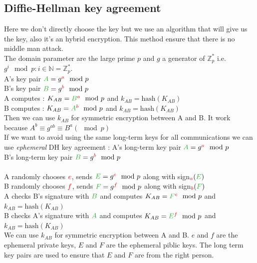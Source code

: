 \documentclass[11pt,a4paper]{report}
\newcommand{\tg}{\textcolor{ao}}
\newcommand{\tr}{\textcolor{red}}
\begin{document}
\subsection{Diffie-Hellman key agreement}
Here we don't directly choose the key but we use an algorithm that will give us the key, also it's an hybrid encryption. This method ensure that there is no middle man attack.\\
The domain parameter are the large prime $p$ and $g$ a generator of $\mathbb{Z}_p^*$ i.e. ${g^i \mod p : i \in \mathbb{N}} = \mathbb{Z}_p^*$. \\
A's key pair $\tg{A} = g^{\tr{a}} \mod p$\\
B's key pair $\tg{B} = g^{\tr{b}} \mod p$\\
A computes : $K_{AB} = \tg{B}^{\tr{a}} \mod p$ and $k_{AB} = \text{hash}(K_{AB})$\\
B computes : $K_{AB} = \tg{A}^{\tr{b}} \mod p$ and $k_{AB} = \text{hash}(K_{AB})$\\
Then we can use $k_{AB}$ for symmetric encryption between A and B. It work because $A^b \equiv g^{ab} \equiv B^a  (\mod p)$\\

If we want to avoid using the same long-term keys for all communications we can use \emph{ephemeral} DH key agreement :
A's long-term key pair $\tg{A} = g^{\tr{a}} \mod p$\\
B's long-term key pair $\tg{B} = g^{\tr{b}} \mod p$\\
\\
A randomly chooses $\tr{e}$, sends $\tg{E} = g^{\tr{e}} \mod p$ along with sign$_{\tr{a}} (\tg{E})$\\
B randomly chooses $\tr{f}$, sends $\tg{F} = g^{\tr{f}} \mod p$ along with sign$_{\tr{b}} (\tg{F})$\\
A checks B's signature with $\tg{B}$ and computes $K_{AB} = \tg{F}^{\tr{e}} \mod p$ and $k_{AB} = \text{hash}(K_{AB})$\\
B checks A's signature with $\tg{A}$ and computes $K_{AB} = \tg{E}^{\tr{f}} \mod p$ and $k_{AB} = \text{hash}(K_{AB})$\\
We can use $k_{AB}$ for symmetric encryption between A and B. $e$ and $f$ are the ephemeral private keys, $E$ and $F$ are the ephemeral piblic keys. The long term key pairs are used to ensure that $E$ and $F$ are from the right person.
\end{document}

